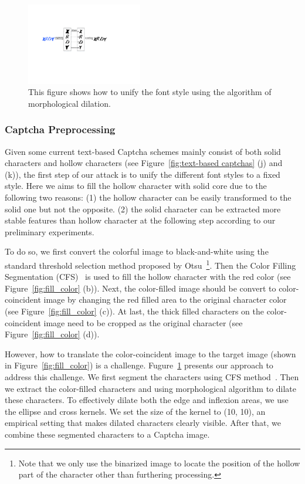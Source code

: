 \begin{figure}
  \centering
  \includegraphics[width=0.45\textwidth]{fig/captcha_preprocessing/preprocessing.pdf}
  \caption{This figure shows how to unify the font style using the algorithm of morphological dilation.}
  \label{fig: preprocessing}
\end{figure}

\subsubsection{Captcha Preprocessing}
Given some current text-based Captcha schemes mainly consist of both solid characters and hollow characters (see Figure~\ref{fig:text-based captchas} (j) and (k)), the first step of our attack is to unify the different font styles to a fixed style. Here we aims to fill the hollow character with solid core due to the following two reasons:
(1) the hollow character can be easily transformed to the solid one but not the opposite.
(2) the solid character can be extracted more stable features than hollow character at the following step according to our preliminary experiments.

To do so, we first convert the colorful image to black-and-white using the standard threshold selection method proposed by Otsu~\cite{Ostu1979A}\footnote{Note that we only use the binarized image to locate the position of the hollow part of the character other than furthering processing.}.
Then the Color Filling Segmentation (CFS)~\cite{Yan2008A} is used to fill the hollow character with the red color (see Figure~\ref{fig:fill_color} (b)). Next, the color-filled image should be convert to color-coincident image by changing the red filled area to the original character color (see Figure~\ref{fig:fill_color} (c)). At last, the thick filled characters on the color-coincident image need to be cropped as the original character (see Figure~\ref{fig:fill_color} (d)).

However, how to translate the color-coincident image to the target image (shown in Figure~\ref{fig:fill_color}) is a challenge. Fugure~\ref{fig: preprocessing} presents our approach to address this challenge. We first segment the characters using CFS method~\cite{Yan2008A}.  Then we extract the color-filled characters and using morphological algorithm to dilate these characters. To effectively dilate both the edge and inflexion areas, we use the ellipse and cross kernels. We set the size of the kernel to (10, 10), an empirical setting that makes dilated characters clearly visible. After that, we combine these segmented characters to a Captcha image.

